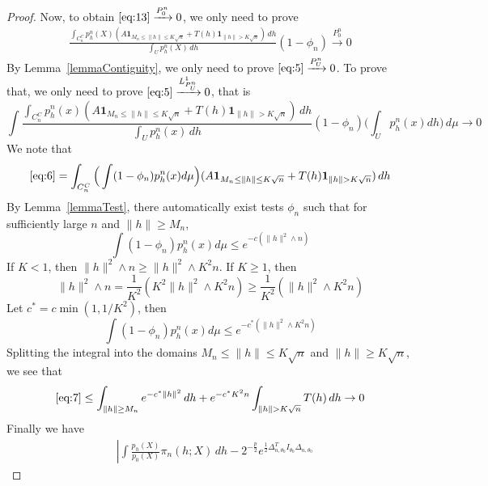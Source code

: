 \begin{proof}
Now, to obtain $\eqref{eq:13}\xrightarrow{P_0^n}0$, we only need to prove
\begin{equation}\label{eq:5}
    \begin{aligned}
        \frac{\int_{C_n^C}p_h^n(X)(A\textbf{1}_{M_n\leq \|h\|\leq K\sqrt{n}}+T(h)\textbf{1}_{\|h\|> K\sqrt{n}})\, dh}{\int_U p_h^n(X)\, dh}(1-\phi_n)\xrightarrow{P_0^n} 0
    \end{aligned}
\end{equation}
By Lemma~\ref{lemmaContiguity}, we only need to prove $\eqref{eq:5}\xrightarrow{P_U^n}0$. To prove that, we only need to prove $\eqref{eq:5}\xrightarrow{L^1_{P_U^n}}0$, that is 
\begin{equation}\label{eq:6}
    \int \frac{\int_{C_n^C}p_h^n(x)(A\textbf{1}_{M_n\leq \|h\|\leq K\sqrt{n}}+T(h)\textbf{1}_{\|h\|> K\sqrt{n}})\, dh}{\int_U p_h^n(x)\, dh}(1-\phi_n)\big(\int_U p_h^n(x)dh\big) \, d\mu  \to 0
\end{equation}
We note that
\begin{equation}\label{eq:7}
    \eqref{eq:6}=\int_{C_n^C} \Big(\int (1-\phi_n)p_h^n(x)d\mu\Big) (A\textbf{1}_{M_n\leq \|h\|\leq K\sqrt{n}}+T(h)\textbf{1}_{\|h\|> K\sqrt{n}})\, dh 
\end{equation}
By Lemma~\ref{lemmaTest}, there automatically exist tests $\phi_n$  such that for sufficiently large $n$ and $\|h\|\geq M_n$,
\begin{equation}
\int (1-\phi_n)p^n_h(x)d\mu\leq e^{-c(\|h\|^2\wedge n)}
\end{equation}
If $K< 1$, then $\|h\|^2\wedge n\geq \|h\|^2\wedge K^2n$. If $K\geq 1$, then
\begin{equation}
    \|h\|^2\wedge n=\frac{1}{K^2}(K^2\|h\|^2\wedge K^2n)\geq \frac{1}{K^2}(\|h\|^2\wedge K^2n)
\end{equation}
Let $c^*=c\min(1,1/K^2)$, then
\begin{equation}
\int (1-\phi_n)p^n_h(x)d\mu\leq e^{-c^*(\|h\|^2\wedge K^2n)}
\end{equation}
Splitting the integral into the domains $M_n\leq \|h\|\leq K\sqrt{n}$ and $\|h\|\geq K\sqrt{n}$, we see that
\begin{equation}
    \eqref{eq:7}\leq \int_{\|h\|\geq M_n}e^{-c^*\|h\|^2}\, dh + e^{-c^*K^2n}\int_{\|h\|>K\sqrt{n}} T(h)\, dh  \to 0
\end{equation}
Finally we have
\begin{equation}
    \begin{aligned}
        &\left|\int \frac{p_h(X)}{p_0(X)}\pi_n (h;X) \, dh-2^{-\frac{p}{2}}e^{\frac{1}{2}\Delta_{n,\theta_0}^TI_{\theta_0}\Delta_{n,\theta_0}}

\end{aligned}
\end{equation}
\end{proof}
